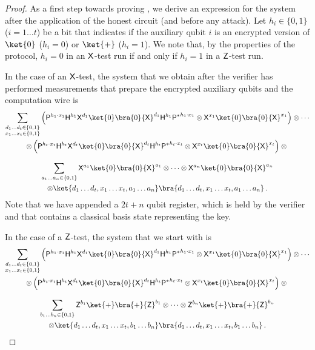 \documentclass{toc}
\newcommand{\hgate}{{\sf H}}
\newcommand{\pgate}{{\sf P}}
\newcommand{\xgate}{{\sf X}}
\newcommand{\zgate}{{\sf Z}}
\newcommand{\ketbra}[2]{\ket{#1}\bra{#2}}			%
\newcommand{\egoketbra}[1]{\ketbra{#1}{#1}}			%
\begin{document}
\begin{proof}

As a first step towards proving , we derive an expression for the system after the application of the honest circuit (and before any attack).
 Let $h_i \in \{0,1\}$ ($i=1 \ldots t$) be a bit that indicates if the auxiliary qubit $i$ is an encrypted version of $\ket{0}$ ($h_i =0$) or $\ket{+}$ ($h_i =1$). We note that, by the properties of the protocol, $h_i=0$ in an $\xgate$-test run if and only if $h_i = 1$ in a $\zgate$-test run.

In the case of an $\xgate$-test, the system that we obtain after the verifier has performed measurements that prepare the encrypted auxiliary qubits and the computation wire is %
%
\begin{multline}
\label{eqn:x-test-start}
 \sum_{\substack{d_1 \ldots d_t \in \{0,1\} \\ x_1 \ldots x_t \in \{0,1\}}}
 \left(\pgate^{h_1 \cdot x_1}\hgate^{h_1} \xgate^{d_1} \egoketbra{0} \xgate^{d_1} {\hgate}^{h_1} {\pgate^*}^{h_1 \cdot x_1} \otimes
  \xgate^{x_1} \egoketbra{0} \xgate^{x_1}\right) \otimes  \cdots  \\
   \otimes  \left( \pgate^{h_t \cdot x_t} \hgate^{h_t} \xgate^{d_t}  \egoketbra{0} \xgate^{d_t} {\hgate}^{h_t} {\pgate^*}^{h_t \cdot x_t} \otimes  \xgate^{x_t} \egoketbra{0} \xgate^{x_t}\right)
\otimes  {}\\[2ex] \sum_{a_1 \ldots a_n \in \{0,1\}} \xgate^{a_1} \egoketbra{0} \xgate^{a_1} \otimes \cdots \otimes \xgate^{a_n} \egoketbra{0} \xgate^{a_n}\\
\otimes \egoketbra{d_1 \ldots d_t, x_1 \ldots x_t,a_1 \ldots a_n}\,.
\end{multline}
Note that we have appended a $2t+n$ qubit register, which is held by the verifier and that contains a classical basis state representing the key.

In the case of a $\zgate$-test, the system that we start with is %
%
\begin{multline}
\label{eqn:z-test-start}
 \sum_{\substack{d_1 \ldots d_t \in \{0,1\}\\ x_1 \ldots x_t \in \{0,1\}}}
\left(\pgate^{h_1 \cdot x_1}\hgate^{h_1} \xgate^{d_1} \egoketbra{0} \xgate^{d_1} {\hgate}^{h_1} {\pgate^*}^{h_1 \cdot x_1} \otimes
  \xgate^{x_1} \egoketbra{0} \xgate^{x_1}\right) \otimes  \cdots  \\
   \otimes  \left( \pgate^{h_t \cdot x_t} \hgate^{h_t} \xgate^{d_t}  \egoketbra{0} \xgate^{d_t} {\hgate}^{h_t} {\pgate^*}^{h_t \cdot x_t} \otimes  \xgate^{x_t} \egoketbra{0} \xgate^{x_t}\right)
\otimes {}\\[2ex]\sum_{b_1 \ldots b_n \in \{0,1\}} \zgate^{b_1} \egoketbra{+} \zgate^{b_1} \otimes \cdots \otimes \zgate^{b_n} \egoketbra{+} \zgate^{b_n}\\
\otimes \egoketbra{d_1 \ldots d_t, x_1 \ldots x_t,b_1 \ldots b_n}\,.
\end{multline}


\end{proof}
\end{document}
